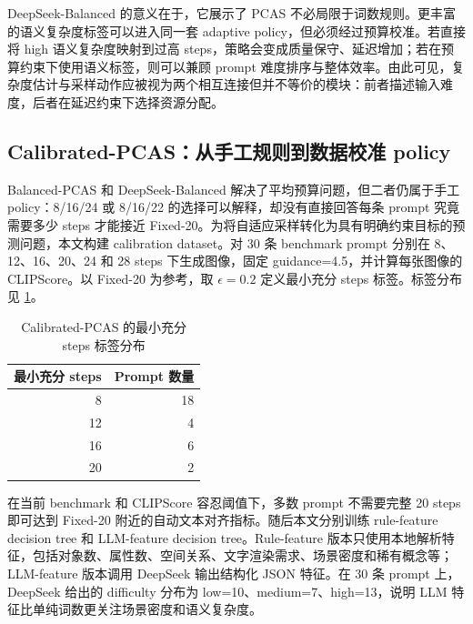 \documentclass[UTF8,zihao=-4,fontset=fandol]{ctexart}
\newcommand{\clipscore}{\textrm{CLIPScore}}
\begin{document}
DeepSeek-Balanced 的意义在于，它展示了 PCAS 不必局限于词数规则。更丰富的语义复杂度标签可以进入同一套 adaptive policy，但必须经过预算校准。若直接将 high 语义复杂度映射到过高 steps，策略会变成质量保守、延迟增加；若在预算约束下使用语义标签，则可以兼顾 prompt 难度排序与整体效率。由此可见，复杂度估计与采样动作应被视为两个相互连接但并不等价的模块：前者描述输入难度，后者在延迟约束下选择资源分配。

\subsection{Calibrated-PCAS：从手工规则到数据校准 policy}

Balanced-PCAS 和 DeepSeek-Balanced 解决了平均预算问题，但二者仍属于手工 policy：8/16/24 或 8/16/22 的选择可以解释，却没有直接回答每条 prompt 究竟需要多少 steps 才能接近 Fixed-20。为将自适应采样转化为具有明确约束目标的预测问题，本文构建 calibration dataset。对 30 条 benchmark prompt 分别在 8、12、16、20、24 和 28 steps 下生成图像，固定 guidance=4.5，并计算每张图像的 \clipscore{}。以 Fixed-20 为参考，取 $\epsilon=0.2$ 定义最小充分 steps 标签。标签分布见 \cref{tab:calibration_labels}。

\begin{table}[H]
  \centering
  \caption{Calibrated-PCAS 的最小充分 steps 标签分布}
  \label{tab:calibration_labels}
  \begin{tabular}{rr}
    \toprule
    最小充分 steps & Prompt 数量 \\
    \midrule
    8 & 18 \\
    12 & 4 \\
    16 & 6 \\
    20 & 2 \\
    \bottomrule
  \end{tabular}
\end{table}

在当前 benchmark 和 \clipscore{} 容忍阈值下，多数 prompt 不需要完整 20 steps 即可达到 Fixed-20 附近的自动文本对齐指标。随后本文分别训练 rule-feature decision tree 和 LLM-feature decision tree。Rule-feature 版本只使用本地解析特征，包括对象数、属性数、空间关系、文字渲染需求、场景密度和稀有概念等；LLM-feature 版本调用 DeepSeek 输出结构化 JSON 特征。在 30 条 prompt 上，DeepSeek 给出的 difficulty 分布为 low=10、medium=7、high=13，说明 LLM 特征比单纯词数更关注场景密度和语义复杂度。
\end{document}
